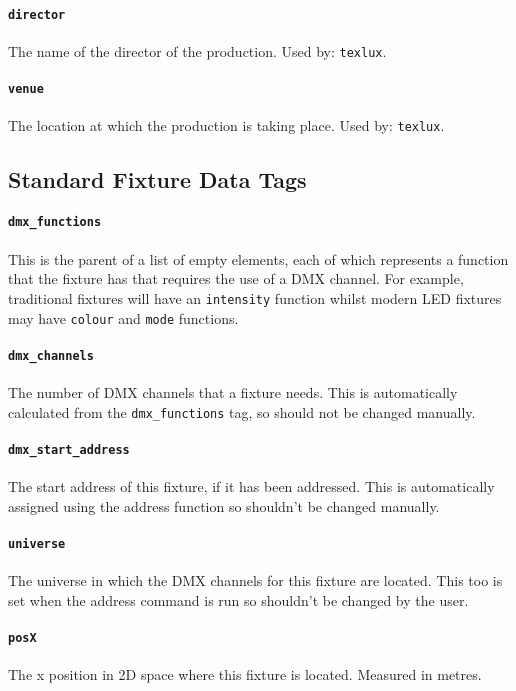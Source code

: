 \documentclass[a4paper]{article}
\begin{document}
\paragraph{\texttt{director}}
The name of the director of the production. Used by: \texttt{texlux}.

\paragraph{\texttt{venue}}
The location at which the production is taking place. Used by: 
\texttt{texlux}.

\subsection{Standard Fixture Data Tags} \label{sec:fixtags}

\paragraph{\texttt{dmx\_functions}}
This is the parent of a list of empty elements, each of which represents a 
function that the fixture has that requires the use of a DMX channel. For 
example, traditional fixtures will have an \texttt{intensity} function 
whilst modern LED fixtures may have \texttt{colour} and \texttt{mode} 
functions.

\paragraph{\texttt{dmx\_channels}}
The number of DMX channels that a fixture needs. This is automatically 
calculated from the \texttt{dmx\_functions} tag, so should not be changed 
manually.

\paragraph{\texttt{dmx\_start\_address}}
The start address of this fixture, if it has been addressed. This is 
automatically assigned using the address function so shouldn't be changed 
manually.

\paragraph{\texttt{universe}}
The universe in which the DMX channels for this fixture are located. This too 
is set when the address command is run so shouldn't be changed by the user. 

\paragraph{\texttt{posX}}
The x position in 2D space where this fixture is located. Measured in metres.
\end{document}
